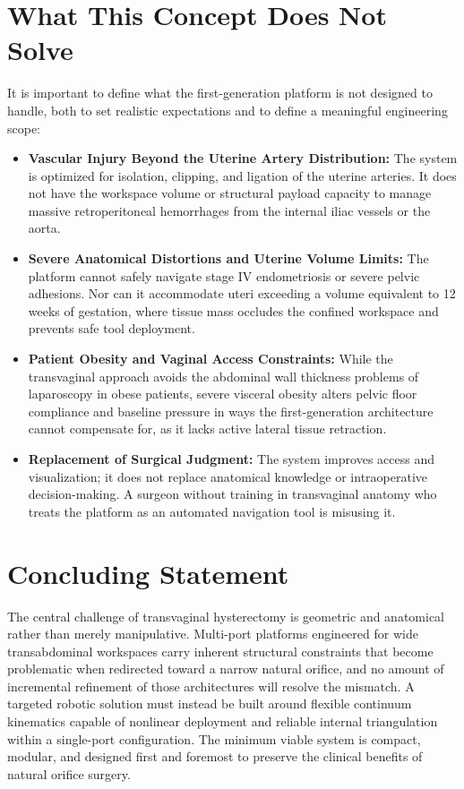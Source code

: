 \documentclass{article}
\begin{document}
\section{What This Concept Does Not Solve}

It is important to define what the first-generation platform is not designed to handle, both to set realistic expectations and to define a meaningful engineering scope:

\begin{itemize}
    \item \textbf{Vascular Injury Beyond the Uterine Artery Distribution:} The system is optimized for isolation, clipping, and ligation of the uterine arteries. It does not have the workspace volume or structural payload capacity to manage massive retroperitoneal hemorrhages from the internal iliac vessels or the aorta.
    \item \textbf{Severe Anatomical Distortions and Uterine Volume Limits:} The platform cannot safely navigate stage IV endometriosis or severe pelvic adhesions. Nor can it accommodate uteri exceeding a volume equivalent to 12 weeks of gestation, where tissue mass occludes the confined workspace and prevents safe tool deployment.
    \item \textbf{Patient Obesity and Vaginal Access Constraints:} While the transvaginal approach avoids the abdominal wall thickness problems of laparoscopy in obese patients, severe visceral obesity alters pelvic floor compliance and baseline pressure in ways the first-generation architecture cannot compensate for, as it lacks active lateral tissue retraction.
    \item \textbf{Replacement of Surgical Judgment:} The system improves access and visualization; it does not replace anatomical knowledge or intraoperative decision-making. A surgeon without training in transvaginal anatomy who treats the platform as an automated navigation tool is misusing it.
\end{itemize}

\section{Concluding Statement}

The central challenge of transvaginal hysterectomy is geometric and anatomical rather than merely manipulative. Multi-port platforms engineered for wide transabdominal workspaces carry inherent structural constraints that become problematic when redirected toward a narrow natural orifice, and no amount of incremental refinement of those architectures will resolve the mismatch. A targeted robotic solution must instead be built around flexible continuum kinematics capable of nonlinear deployment and reliable internal triangulation within a single-port configuration. The minimum viable system is compact, modular, and designed first and foremost to preserve the clinical benefits of natural orifice surgery.
\end{document}
